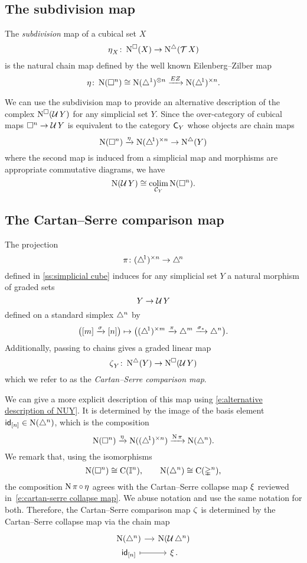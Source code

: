 \subsection{The subdivision map}

The \textit{subdivision} map of a cubical set $X$
\[
\operatorname{\eta}_X \colon \operatorname{N^{\square}}(X) \to \operatorname{N^{\triangle}}(\operatorname{\mathcal{T}} X)
\]
is the natural chain map defined by the well known Eilenberg--Zilber map
\[
\operatorname{\eta} \colon \operatorname{N}(\square^n) \cong \operatorname{N}(\triangle^1)^{\otimes n} \xrightarrow{EZ} \operatorname{N} (\triangle^{\!1})^{\times n}.
\]

We can use the subdivision map to provide an alternative description of the complex $\operatorname{N^{\square}}(\operatorname{\mathcal{U}} Y)$ for any simplicial set $Y$.
Since the over-category of cubical maps $\square^n \to \operatorname{\mathcal{U}} Y$ is equivalent to the category $\mathsf{C}_Y$ whose objects are chain maps
\[
\operatorname{N}(\square^n) \xrightarrow{\operatorname{\eta}} \operatorname{N} (\triangle^{\!1})^{\times n} \to \operatorname{N^{\triangle}}(Y)
\]
where the second map is induced from a simplicial map
and morphisms are appropriate commutative diagrams, we have
\begin{equation} \label{e:alternative description of NUY}
\operatorname{N}(\operatorname{\mathcal{U}} Y) \cong \operatorname*{colim}_{\mathcal{C}_Y} \operatorname{N}(\square^n).
\end{equation}

\subsection{The Cartan--Serre comparison map} \label{ss:comparison map}

The projection
\[
\operatorname{\pi} \colon (\triangle^{\!1})^{\times n} \to \triangle^{\!n}
\]
defined in \cref{ss:simplicial cube} induces for any simplicial set $Y$ a natural morphism of graded sets
\[
Y \to \operatorname{\mathcal{U}} Y
\]
defined on a standard simplex $\triangle^n$ by
\[
\big( [m] \xrightarrow{\sigma} [n] \big) \mapsto
\big( (\triangle^{\!1})^{\times m} \xrightarrow{\operatorname{\pi}} \triangle^m \xrightarrow{\sigma_\ast} \triangle^n \big).
\]
Additionally, passing to chains gives a graded linear map
\[
\operatorname{\zeta}_Y \colon \operatorname{N^{\triangle}}(Y) \to \operatorname{N^{\square}}(\operatorname{\mathcal{U}} Y)
\]
which we refer to as the \textit{Cartan--Serre comparison map}.

We can give a more explicit description of this map using \eqref{e:alternative description of NUY}.
It is determined by the image of the basis element $\mathsf{id}_{[n]} \in \operatorname{N}(\triangle^n)$, which is the composition
\[
\operatorname{N}(\square^n) \xrightarrow{\operatorname{\eta}} \operatorname{N}((\triangle^{\!1})^{\times n}) \xrightarrow{\operatorname{N} \operatorname{\pi}} \operatorname{N}(\triangle^n).
\]
We remark that, using the isomorphisms
\[
\operatorname{N}(\square^n) \cong \operatorname{C}(\mathbb{I}^n), \qquad
\operatorname{N}(\triangle^n) \cong \operatorname{C}(\mathbb{\Delta}^n),
\]
the composition $\operatorname{N} \operatorname{\pi} \circ \operatorname{\eta}$ agrees with the Cartan--Serre collapse map $\operatorname{\xi}$ reviewed in~\eqref{e:cartan-serre collapse map}.
We abuse notation and use the same notation for both.
Therefore, the Cartan--Serre comparison map $\operatorname{\zeta}$ is determined by the Cartan--Serre collapse map via the chain map
\[
\begin{tikzcd}[column sep=small, row sep=0]
\chains(\simplex^n) \arrow[r] &
\chains(\cubify \simplex^n) \\
\id_{[n]} \arrow[r, mapsto] &
\CScollapse.
\end{tikzcd}
\]

